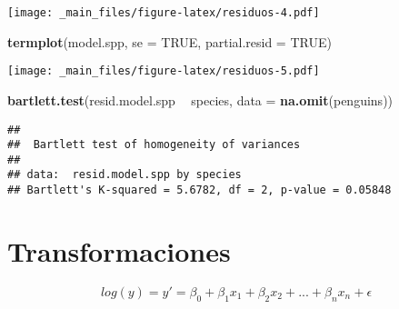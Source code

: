 \documentclass[
]{book}
\newenvironment{Shaded}{\begin{snugshade}}{\end{snugshade}}
\newcommand{\DataTypeTok}[1]{\textcolor[rgb]{0.13,0.29,0.53}{#1}}
\newcommand{\KeywordTok}[1]{\textcolor[rgb]{0.13,0.29,0.53}{\textbf{#1}}}
\newcommand{\NormalTok}[1]{#1}
\newcommand{\OperatorTok}[1]{\textcolor[rgb]{0.81,0.36,0.00}{\textbf{#1}}}
\newcommand{\OtherTok}[1]{\textcolor[rgb]{0.56,0.35,0.01}{#1}}
\newcommand{\StringTok}[1]{\textcolor[rgb]{0.31,0.60,0.02}{#1}}
\begin{document}
\texttt{[image: \_main\_files/figure-latex/residuos-4.pdf]}

\begin{Shaded}
\begin{Highlighting}[]
\KeywordTok{termplot}\NormalTok{(model.spp, }\DataTypeTok{se =} \OtherTok{TRUE}\NormalTok{, }\DataTypeTok{partial.resid =} \OtherTok{TRUE}\NormalTok{)}
\end{Highlighting}
\end{Shaded}

\texttt{[image: \_main\_files/figure-latex/residuos-5.pdf]}

\begin{Shaded}
\begin{Highlighting}[]
\KeywordTok{bartlett.test}\NormalTok{(resid.model.spp }\OperatorTok{~}\StringTok{ }\NormalTok{species, }\DataTypeTok{data =} \KeywordTok{na.omit}\NormalTok{(penguins)) }
\end{Highlighting}
\end{Shaded}

\begin{verbatim}
## 
##  Bartlett test of homogeneity of variances
## 
## data:  resid.model.spp by species
## Bartlett's K-squared = 5.6782, df = 2, p-value = 0.05848
\end{verbatim}

\hypertarget{transformaciones}{%
\section{Transformaciones}\label{transformaciones}}

\[log(y) = y' = \beta_0 + \beta_1 x_1 + \beta_2 x_2 + ... + \beta_n x_n + \epsilon\]
\end{document}
